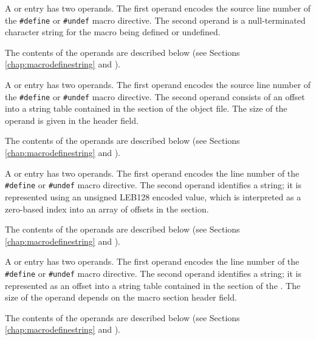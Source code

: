 \begin{enumerate}[1. ]

\itembfnl{\DWMACROdefineTARG{}, \DWMACROundefTARG{}}
A \DWMACROdefineNAME{} or \DWMACROundefNAME{} entry has two
operands. The first operand encodes the source line number 
of the \texttt{\#define} or \texttt{\#undef} macro directive.
The second operand is a null-terminated character
string for the macro being defined or undefined. 

The contents of the operands are described below (see Sections 
\ref{chap:macrodefinestring} and ).

\itembfnl{\DWMACROdefinestrpTARG{}, \DWMACROundefstrpTARG{}}
A \DWMACROdefinestrpNAME{} or \DWMACROundefstrpNAME{} 
entry has two operands.  The first operand encodes the source line number
of the \texttt{\#define} or \texttt{\#undef} macro directive. 
The second operand consists of an offset into a string table contained in
the \dotdebugstr{} section of the object file.  The size of the operand is
given in the header \HFNoffsetsizeflag{} field. 

The contents of the operands are described below (see Sections 
\ref{chap:macrodefinestring} and ).

\itembfnl{\DWMACROdefinestrxTARG{}, \DWMACROundefstrxTARG{}}
A \DWMACROdefinestrxNAME{} or \DWMACROundefstrxNAME{} entry 
has two operands.  The first operand encodes the line number 
of the \texttt{\#define} or \texttt{\#undef} macro directive.
The second operand identifies a string; it is represented using an 
unsigned LEB128 encoded value,
which is interpreted as a zero-based index into an array of offsets in the
\dotdebugstroffsets{} section. 

The contents of the operands are described below (see Sections 
\ref{chap:macrodefinestring} and ).

\itembfnl{\DWMACROdefinesupTARG{}, \DWMACROundefsupTARG{}}
A \DWMACROdefinesupNAME{} or \DWMACROundefsupNAME{} entry 
has two operands.  The first operand encodes the line number 
of the \texttt{\#define} or \texttt{\#undef} macro directive.
The second operand identifies a string; it is represented as
an offset into a string table contained in the \dotdebugstr{} 
section of the .  
The size of the operand depends on the macro section header 
\HFNoffsetsizeflag{} field.  

The contents of the operands are described below (see Sections 
\ref{chap:macrodefinestring} and ).

\end{enumerate}


